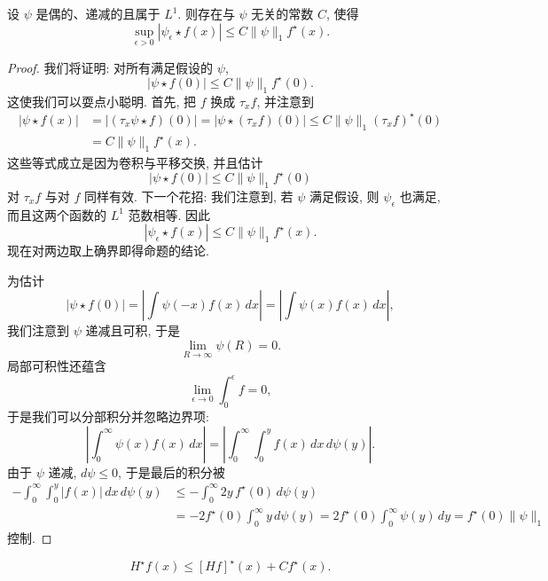 \begin{proposition}\label{prop:2.38}
设 $\psi$ 是偶的、递减的且属于 $L^{1}$. 则存在与 $\psi$ 无关的常数 $C$, 使得
\[
\sup_{\epsilon>0}|\psi_{\epsilon}\star f(x)|\leq C\|\psi\|_{1}f^{\star}(x).
\]
\end{proposition}

\begin{proof}
我们将证明: 对所有满足假设的 $\psi$,
\[
|\psi\star f(0)|\leq C\|\psi\|_{1}f^{\star}(0).
\]
这使我们可以耍点小聪明. 首先, 把 $f$ 换成 $\tau_{x}f$, 并注意到
\begin{align*}
|\psi\star f(x)|&=|(\tau_{x}\psi\star f)(0)|
=|\psi\star(\tau_{x} f)(0)|\leq C\|\psi\|_{1}(\tau_{x} f)^{\star}(0) \\
&=C\|\psi\|_{1}f^{\star}(x).
\end{align*}
这些等式成立是因为卷积与平移交换, 并且估计
\[
|\psi\star f(0)|\leq C\|\psi\|_{1}f^{\star}(0)
\]
对 $\tau_x f$ 与对 $f$ 同样有效. 下一个花招: 我们注意到, 若 $\psi$ 满足假设, 则 $\psi_\epsilon$ 也满足, 而且这两个函数的 $L^1$ 范数相等. 因此
\[
|\psi_{\epsilon}\star f(x)|\leq C\|\psi\|_{1}f^{\star}(x).
\]
现在对两边取上确界即得命题的结论.

为估计
\[
|\psi\star f(0)|=\left|\int\psi(-x)f(x)\,dx\right|=\left|\int\psi(x)f(x)\,dx\right|,
\]
我们注意到 $\psi$ 递减且可积, 于是
\[
\lim_{R\to\infty}\psi(R)=0.
\]
局部可积性还蕴含
\[
\lim_{\epsilon\to0}\int_{0}^{\epsilon}f=0,
\]
于是我们可以分部积分并忽略边界项:
\[
\left|\int_{0}^{\infty}\psi(x)f(x)\,dx\right|
=\left|\int_{0}^{\infty}\int_{0}^{y}f(x)\,dx\,d\psi(y)\right|.
\]
由于 $\psi$ 递减, $d\psi\leq 0$, 于是最后的积分被
\begin{align*}
-\int_{0}^{\infty}\int_{0}^{y}|f(x)|\,dx\,d\psi(y)
&\leq-\int_{0}^{\infty}2y\,f^{\star}(0)\,d\psi(y) \\
&=-2f^{\star}(0)\int_{0}^{\infty}y\,d\psi(y)
=2f^{\star}(0)\int_{0}^{\infty}\psi(y)\,dy=f^{\star}(0)\|\psi\|_{1}
\end{align*}
控制.
\end{proof}

\begin{proposition}\label{prop:2.39}
\[
H^{\star}f(x)\leq[H f]^{\star}(x)+C f^{\star}(x).
\]
\end{proposition}

